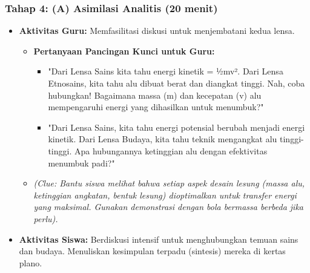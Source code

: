 \documentclass[a4paper,12pt]{article}
\begin{document}
\subsubsection{Tahap 4: (A) Asimilasi Analitis (20 menit)}
\begin{itemize}
\item \textbf{Aktivitas Guru:} Memfasilitasi diskusi untuk menjembatani kedua lensa.
    \begin{itemize}
    \item \textbf{Pertanyaan Pancingan Kunci untuk Guru:}
        \begin{itemize}
        \item "Dari Lensa Sains kita tahu energi kinetik = ½mv². Dari Lensa Etnosains, kita tahu alu dibuat berat dan diangkat tinggi. Nah, coba hubungkan! Bagaimana massa (m) dan kecepatan (v) alu mempengaruhi energi yang dihasilkan untuk menumbuk?"
        \item "Dari Lensa Sains, kita tahu energi potensial berubah menjadi energi kinetik. Dari Lensa Budaya, kita tahu teknik mengangkat alu tinggi-tinggi. Apa hubungannya ketinggian alu dengan efektivitas menumbuk padi?"
        \end{itemize}
    \item \textit{(Clue: Bantu siswa melihat bahwa setiap aspek desain lesung (massa alu, ketinggian angkatan, bentuk lesung) dioptimalkan untuk transfer energi yang maksimal. Gunakan demonstrasi dengan bola bermassa berbeda jika perlu).}
    \end{itemize}
\item \textbf{Aktivitas Siswa:} Berdiskusi intensif untuk menghubungkan temuan sains dan budaya. Menuliskan kesimpulan terpadu (sintesis) mereka di kertas plano.
\end{itemize}
\end{document}

